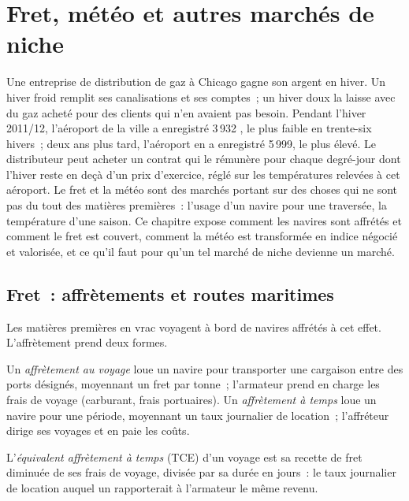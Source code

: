 \chapter{Fret, météo et autres marchés de niche}\label{ch:m3:freight-weather-and-other-corners}

Une entreprise de distribution de gaz à Chicago gagne son argent en hiver. Un hiver froid remplit ses canalisations et ses
comptes~; un hiver doux la laisse avec du gaz acheté pour des clients qui n'en avaient pas besoin.
Pendant l'hiver 2011/12, l'aéroport de la ville a enregistré 3\,932 , le plus faible en
trente-six hivers~; deux ans plus tard, l'aéroport en a enregistré 5\,999, le plus élevé. Le distributeur peut acheter un
contrat qui le rémunère pour chaque degré-jour dont l'hiver reste en deçà
d'un prix d'exercice, réglé sur les températures relevées à cet aéroport. Le fret et la météo sont des marchés portant sur
des choses qui ne sont pas du tout des matières premières~: l'usage d'un navire pour une traversée, la température
d'une saison. Ce chapitre expose comment les navires sont affrétés et comment le fret est couvert, comment
la météo est transformée en indice négocié et valorisée, et ce qu'il faut pour qu'un tel marché de niche
devienne un marché.

\section{Fret~: affrètements et routes maritimes}

Les matières premières en vrac voyagent à bord de navires affrétés à cet effet. L'affrètement prend deux formes.

\begin{definition}\label{def:m3:freight-weather-and-other-corners:charter}
Un \emph{affrètement au voyage} loue un navire pour transporter une cargaison entre des ports
désignés, moyennant un fret par tonne~; l'armateur prend en charge les frais de voyage (carburant, frais portuaires). Un
\emph{affrètement à temps} loue un navire pour une période, moyennant un taux journalier de location~;
l'affréteur dirige ses voyages et en paie les coûts.
\end{definition}

\begin{definition}\label{def:m3:freight-weather-and-other-corners:tce}
L'\emph{équivalent affrètement à temps} (TCE) d'un voyage est sa recette de fret
diminuée de ses frais de voyage, divisée par sa durée en jours~: le taux journalier de location auquel un
 rapporterait à l'armateur le même revenu.
\end{definition}

